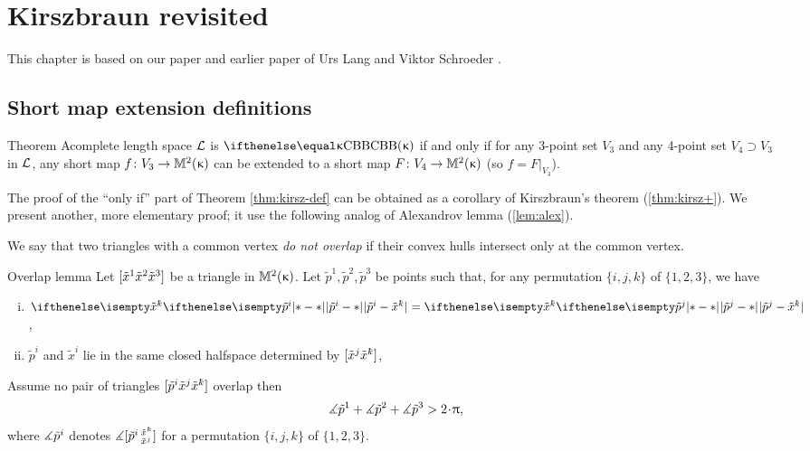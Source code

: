 \chapter{Kirszbraun revisited}

This chapter is based on our paper \cite{alexander-kapovitch-kirszbraun}
and earlier paper of Urs Lang and  Viktor Schroeder
\cite{lang-schroeder}.


\section{Short map extension definitions}\label{sec:4pt}

\begin{thm}{Theorem}\label{thm:kirsz-def} 
Acomplete length space
$\mathcal{L}$ is $\Alex\kappa$ if and only if for any 3-point set $V_3$ and any 4-point set $V_4\supset V_3$ in $\mathcal{L}$, 
any short map $f\:V_3\to\Lob2\kappa$ can be extended to a short map $F\:V_4\to\Lob2\kappa$ (so $f=F|_{V_3}$).
\end{thm}

The proof of the ``only if'' part of Theorem \ref{thm:kirsz-def} can be obtained as a corollary of Kirszbraun's theorem (\ref{thm:kirsz+}).
We present another, more elementary proof; it use the following analog of Alexandrov lemma (\ref{lem:alex}).

We say that  two triangles with a common vertex  \emph{do not overlap} if their convex hulls intersect only at the common vertex.


\begin{thm}{Overlap lemma}\label{lem:extend-overlap}
Let $[{\tilde x^1}{\tilde x^2}{\tilde x^3}]$ be a triangle in $\mathbb{M}_{{}}^{2}({\upkappa})$.  Let $\tilde p^1,\tilde p^2,\tilde p^3$ be points such that, for any permutation $\{i,j,k\}$ of $\{1,2,3\}$, we have
\begin{enumerate}[(i)]

\item 
\label{no-overlap:px=px}
$\dist{\tilde p^i}{\tilde x^\kay}{}=\dist{\tilde p^j}{\tilde x^\kay}{}$,

\item
\label{no-overlap:orient-1}
$\tilde p^i$ and $\tilde x^i$ lie in the same closed halfspace determined by $[\tilde x^j\tilde x^\kay]$,  
\end{enumerate}

Assume no pair of triangles $\trig{\tilde p^i}{\tilde x^j}{\tilde x^\kay}$ overlap
then 
\[\mangle{\tilde p^1} +\mangle {\tilde p^2}+\mangle{\tilde p^3}> 2\cdot\pi,\]
where $\measuredangle\tilde p^i$ denotes $\mangle\hinge{\tilde p^i}{\tilde x^\kay}{\tilde x^j}$
for a permutation $\{i,j,k\}$ of $\{1,2,3\}$.
\end{thm}


